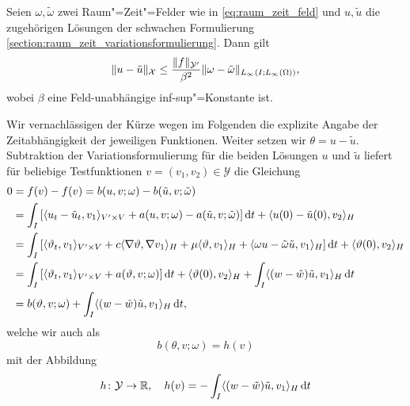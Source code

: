 \documentclass[../main.tex]{subfiles}
\begin{document}
\begin{Lemma}
\label{lemma:stabilitaetsaussage}
    Seien $\omega, \tilde{\omega}$ zwei Raum"=Zeit"=Felder wie in \cref{eq:raum_zeit_feld} und $u, \tilde{u}$ die zugehörigen Lösungen der schwachen Formulierung \cref{section:raum_zeit_variationsformulierung}.
    Dann gilt
    \begin{equation}
        \lVert u - \tilde{u}\rVert_{\mathcal X} \leq \frac{\lVert f\rVert_{\mathcal Y'}}{\beta^{2}} \lVert\omega - \tilde{\omega}\rVert_{L_{\infty}(I; L_{\infty}(\Omega))},
    \end{equation}
    wobei $\beta$ eine Feld-unabhängige inf-sup"=Konstante ist.

    \begin{Beweis}
        Wir vernachlässigen der Kürze wegen im Folgenden die explizite Angabe der Zeitabhängigkeit der jeweiligen Funktionen.
        Weiter setzen wir $\theta = u - \tilde{u}$.
        Subtraktion der Variationsformulierung für die beiden Lösungen $u$ und $\tilde{u}$ liefert für beliebige Testfunktionen $v = (v_{1}, v_{2}) \in \mathcal Y$ die Gleichung
        \begin{align}
            0
            &= f(v) - f(v) = b(u, v; \omega) - b(\tilde{u}, v; \tilde{\omega})
           \\&= \int_{I} \left[ \langle u_{t} - \tilde{u}_{t},v_{1}\rangle_{V' \times V} + a(u, v; \omega) - a(\tilde{u}, v; \tilde{\omega}) \right] \mathop{}\!\mathrm{d} t + \langle u(0) - \tilde{u}(0),v_{2}\rangle_{H}
           \\&= \int_{I} \left[ \langle\vartheta_{t},v_{1}\rangle_{V' \times V} + c \langle\nabla \vartheta,\nabla v_{1}\rangle_{H} + \mu \langle\vartheta,v_{1}\rangle_{H} + \langle\omega u - \tilde{\omega}\tilde{u},v_{1}\rangle_{H} \right] \mathop{}\!\mathrm{d} t + \langle\vartheta(0),v_{2}\rangle_{H}
           \\&= \int_{I} \left[ \langle\vartheta_{t},v_{1}\rangle_{V' \times V} + a(\vartheta, v; \omega) \right] \mathop{}\!\mathrm{d} t + \langle\vartheta(0),v_{2}\rangle_{H} + \int_{I} \langle(w - \tilde{w})\tilde{u},v_{1}\rangle_{H} \mathop{}\!\mathrm{d} t
           \\&= b(\vartheta, v; \omega) + \int_{I} \langle(w - \tilde{w})\tilde{u},v_{1}\rangle_{H} \mathop{}\!\mathrm{d} t,
        \end{align}
        welche wir auch als
        \begin{equation}
            \label{eq:stabilitaetsaussage:beweis:variationsproblem}
            b(\theta, v; \omega) = h(v)
        \end{equation}
        mit der Abbildung
        \begin{equation}
            h \colon \mathcal Y \to \mathbb{R}, \quad h(v) = - \int_{I} \skp{(w - \tilde{w})\tilde{u}}{v_{1}}{H} \diff t

\end{equation}
\end{Beweis}
\end{Lemma}
\end{document}
